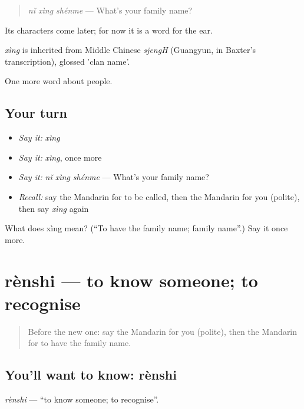\begin{quote}
\emph{nǐ xìng shénme} — What's your family name?
\end{quote}

Its characters come later; for now it is a word for the ear.

\begin{cousinweb}
\emph{xìng} is inherited from Middle Chinese \emph{sjengH} (Guangyun, in Baxter's transcription), glossed 'clan name'.
\end{cousinweb}

\begin{grammarlens}[title={What you've built}]
One more word about people.
\end{grammarlens}

\subsection*{Your turn}
\begin{itemize}
\raggedright
  \item \emph{Say it:} \emph{xìng}
  \item \emph{Say it:} \emph{xìng}, once more
  \item \emph{Say it:} \emph{nǐ xìng shénme} — What's your family name?
  \item \emph{Recall:} say the Mandarin for to be called, then the Mandarin for you (polite), then say \emph{xìng} again
\end{itemize}

\begin{tcolorbox}[breakable,colback=teal!4,colframe=teal!35!black,title={Before you move on}]
What does xìng mean? (\textquotedblleft{}To have the family name; family name\textquotedblright{}.) Say it once more.
\end{tcolorbox}
\section[rènshi]{rènshi — to know someone; to recognise}

\label{lesson:ZH-C34-renshi}



\begin{quote}
Before the new one: say the Mandarin for you (polite), then the Mandarin for to have the family name.
\end{quote}

\subsection*{You'll want to know: rènshi}
\emph{rènshi} — \textquotedblleft{}to know someone; to recognise\textquotedblright{}.

